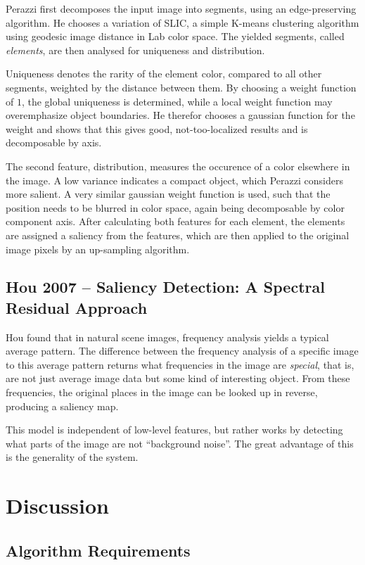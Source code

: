 \documentclass[a4paper,12pt,fleqn,oneside]{scrartcl}
\begin{document}
Perazzi first decomposes the input image into segments, using an edge-preserving algorithm. He chooses a variation of
SLIC, a simple K-means clustering algorithm using geodesic image distance in Lab color space. The yielded segments,
called \emph{elements}, are then analysed for uniqueness and distribution.

Uniqueness denotes the rarity of the element color, compared to all other segments, weighted by the distance between
them. By choosing a weight function of $1$, the global uniqueness is determined, while a local weight function may
overemphasize object boundaries. He therefor chooses a gaussian function for the weight and shows that this gives good,
not-too-localized results and is decomposable by axis.

The second feature, distribution, measures the occurence of a color elsewhere in the image. A low variance indicates a
compact object, which Perazzi considers more salient. A very similar gaussian weight function is used, such that the
position needs to be blurred in color space, again being decomposable by color component axis. After calculating both
features for each element, the elements are assigned a saliency from the features, which are then applied to the
original image pixels by an up-sampling algorithm.

\subsection{Hou 2007 -- Saliency Detection: A Spectral Residual Approach}

Hou found that in natural scene images, frequency analysis yields a typical average pattern. The difference between the
frequency analysis of a specific image to this average pattern returns what frequencies in the image are \emph{special},
that is, are not just average image data but some kind of interesting object. From these frequencies, the original
places in the image can be looked up in reverse, producing a saliency map.

This model is independent of low-level features, but rather works by detecting what parts of the image are not ``background
noise''. The great advantage of this is the generality of the system.

\section{Discussion}

\subsection{Algorithm Requirements}
\end{document}
